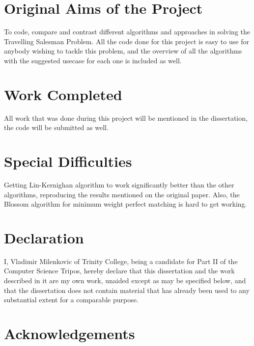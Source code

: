 \documentclass[12pt,twoside,notitlepage]{report}
\begin{document}
\section*{Original Aims of the Project}

To code, compare and contrast different algorithms and approaches in solving the Travelling Salesman Problem. All the code done for this project is easy to use for anybody wishing to tackle this problem, and the overview of all the algorithms with the suggested usecase for each one is included as well.

\section*{Work Completed}

All work that was done during this project will be mentioned in the dissertation, the code will be submitted as well.

\section*{Special Difficulties}

Getting Lin-Kernighan algorithm to work significantly better than the other algorithms, reproducing the results mentioned on the original paper\cite{lin1973effective}. Also, the Blossom algorithm for minimum weight perfect matching is hard to get working. %
 
\newpage
\section*{Declaration}

I, Vladimir Milenkovic of Trinity College, being a candidate for Part II of the Computer
Science Tripos, hereby declare
that this dissertation and the work described in it are my own work,
unaided except as may be specified below, and that the dissertation
does not contain material that has already been used to any substantial
extent for a comparable purpose.

\bigskip
{}

\medskip
{} %

\cleardoublepage

\tableofcontents

\listoffigures

\newpage
\section*{Acknowledgements}
\end{document}
